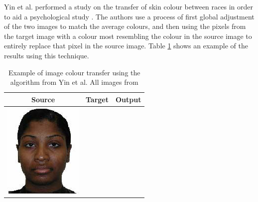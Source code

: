 \begin{table}[H]
\begin{tabular}{|c|c|c|}
\begin{minipage}{.29\textwidth}
  \end{minipage} \\
    \hline
\end{tabular}
\end{table}

Yin et al. performed a study on the transfer of skin colour between races in order to aid a psychological study \cite{yin_2004_transfer}. The authors use a process of first global adjustment of the two images to match the average colours, and then using the pixels from the target image with a colour most resembling the colour in the source image to entirely replace that pixel in the source image. Table \ref{tab:yin_demo} shows an example of the results using this technique.

\begin{table}[H]
    \centering
    \caption{Example of image colour transfer using the algorithm from Yin et al. All images from \cite{yin_2004_transfer} \label{tab:yin_demo}}    
\begin{tabular}{|c|c|c|}
    \hline
    Source & Target & Output \\
    \hline
  \begin{minipage}{.29\textwidth}
    \includegraphics[width=\textwidth,height=\textheight,keepaspectratio]{images/yin_orig1}

\end{minipage}
\end{tabular}
\end{table}
